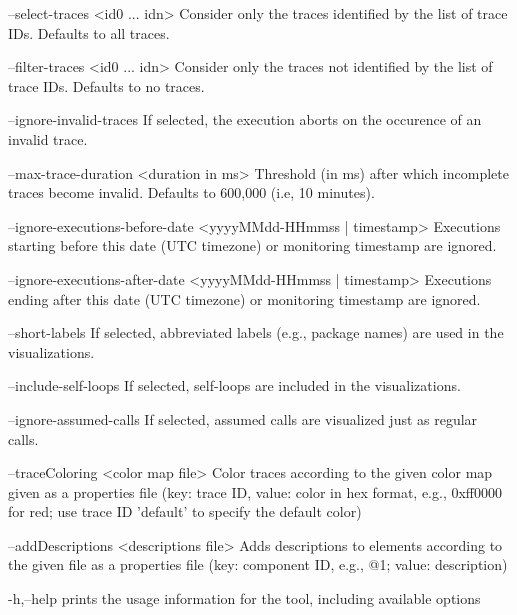     --select-traces <id0 ... idn>
        Consider only the traces identified by the list of trace IDs.
        Defaults to all traces.

    --filter-traces <id0 ... idn>
        Consider only the traces not identified by the list of trace IDs.
        Defaults to no traces.

    --ignore-invalid-traces
        If selected, the execution aborts on the occurence of an invalid
        trace.

    --max-trace-duration <duration in ms>
        Threshold (in ms) after which incomplete traces become invalid.
        Defaults to 600,000 (i.e, 10 minutes).

    --ignore-executions-before-date <yyyyMMdd-HHmmss | timestamp>
        Executions starting before this date (UTC timezone) or monitoring
        timestamp are ignored.

    --ignore-executions-after-date <yyyyMMdd-HHmmss | timestamp>
        Executions ending after this date (UTC timezone) or monitoring
        timestamp  are ignored.

    --short-labels
        If selected, abbreviated labels (e.g., package names) are used in
        the visualizations.

    --include-self-loops
        If selected, self-loops are included in the visualizations.

    --ignore-assumed-calls
        If selected, assumed calls are visualized just as regular calls.

    --traceColoring <color map file>
        Color traces according to the given color map given as a
        properties file (key: trace ID, value: color in hex format, e.g.,
        0xff0000 for red; use trace ID 'default' to specify the default
        color)

    --addDescriptions <descriptions file>
        Adds descriptions to elements according to the given file as a
        properties file (key: component ID, e.g., @1; value: description)

 -h,--help
        prints the usage information for the tool, including available
        options